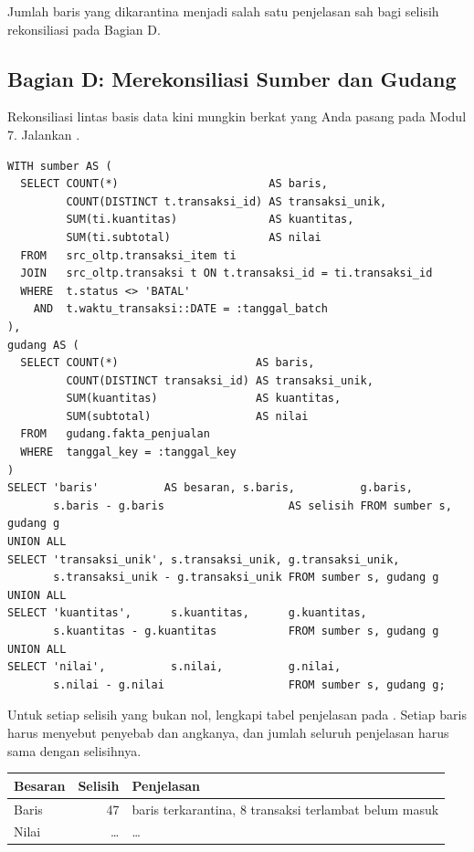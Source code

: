 Jumlah baris yang dikarantina menjadi salah satu penjelasan sah bagi selisih
rekonsiliasi pada Bagian D.

\subsection{Bagian D: Merekonsiliasi Sumber dan Gudang}


Rekonsiliasi lintas basis data kini mungkin berkat 
yang Anda pasang pada Modul 7. Jalankan
.

\begin{lstlisting}[style=sqlgaya]
WITH sumber AS (
  SELECT COUNT(*)                       AS baris,
         COUNT(DISTINCT t.transaksi_id) AS transaksi_unik,
         SUM(ti.kuantitas)              AS kuantitas,
         SUM(ti.subtotal)               AS nilai
  FROM   src_oltp.transaksi_item ti
  JOIN   src_oltp.transaksi t ON t.transaksi_id = ti.transaksi_id
  WHERE  t.status <> 'BATAL'
    AND  t.waktu_transaksi::DATE = :tanggal_batch
),
gudang AS (
  SELECT COUNT(*)                     AS baris,
         COUNT(DISTINCT transaksi_id) AS transaksi_unik,
         SUM(kuantitas)               AS kuantitas,
         SUM(subtotal)                AS nilai
  FROM   gudang.fakta_penjualan
  WHERE  tanggal_key = :tanggal_key
)
SELECT 'baris'          AS besaran, s.baris,          g.baris,
       s.baris - g.baris                   AS selisih FROM sumber s, gudang g
UNION ALL
SELECT 'transaksi_unik', s.transaksi_unik, g.transaksi_unik,
       s.transaksi_unik - g.transaksi_unik FROM sumber s, gudang g
UNION ALL
SELECT 'kuantitas',      s.kuantitas,      g.kuantitas,
       s.kuantitas - g.kuantitas           FROM sumber s, gudang g
UNION ALL
SELECT 'nilai',          s.nilai,          g.nilai,
       s.nilai - g.nilai                   FROM sumber s, gudang g;
\end{lstlisting}


Untuk setiap selisih yang bukan nol, lengkapi tabel penjelasan pada
. Setiap baris harus menyebut penyebab dan
angkanya, dan jumlah seluruh penjelasan harus sama dengan selisihnya.

\begin{center}
\small
\begin{tabular}{@{}p{}r>{\raggedright\arraybackslash}p{}@{}}
\toprule
\textbf{Besaran} & \textbf{Selisih} & \textbf{Penjelasan} \\
\midrule
Baris & 47 & 39 baris terkarantina, 8 transaksi terlambat belum masuk \\
Nilai & \ldots & \ldots \\
\bottomrule
\end{tabular}
\end{center}

